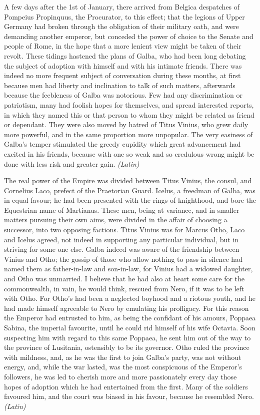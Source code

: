 
A few days after the 1st of January, there arrived from Belgica despatches of Pompeius Propinquus, the Procurator, to this effect; that the legions of Upper Germany had broken through the obligation of their military oath, and were demanding another emperor, but conceded the power of choice to the Senate and people of Rome, in the hope that a more lenient view might be taken of their revolt. These tidings hastened the plans of Galba, who had been long debating the subject of adoption with himself and with his intimate friends. There was indeed no more frequent subject of conversation during these months, at first because men had liberty and inclination to talk of such matters, afterwards because the feebleness of Galba was notorious. Few had any discrimination or patriotism, many had foolish hopes for themselves, and spread interested reports, in which they named this or that person to whom they might be related as friend or dependant. They were also moved by hatred of Titus Vinius, who grew daily more powerful, and in the same proportion more unpopular. The very easiness of Galba's temper stimulated the greedy cupidity which great advancement had excited in his friends, because with one so weak and so credulous wrong might be done with less risk and greater gain. \emph{(Latin)}


The real power of the Empire was divided between Titus Vinius, the consul, and Cornelius Laco, prefect of the Praetorian Guard. Icelus, a freedman of Galba, was in equal favour; he had been presented with the rings of knighthood, and bore the Equestrian name of Martianus. These men, being at variance, and in smaller matters pursuing their own aims, were divided in the affair of choosing a successor, into two opposing factions. Titus Vinius was for Marcus Otho, Laco and Icelus agreed, not indeed in supporting any particular individual, but in striving for some one else. Galba indeed was aware of the friendship between Vinius and Otho; the gossip of those who allow nothing to pass in silence had named them as father-in-law and son-in-law, for Vinius had a widowed daughter, and Otho was unmarried. I believe that he had also at heart some care for the commonwealth, in vain, he would think, rescued from Nero, if it was to be left with Otho. For Otho's had been a neglected boyhood and a riotous youth, and he had made himself agreeable to Nero by emulating his profligacy. For this reason the Emperor had entrusted to him, as being the confidant of his amours, Poppaea Sabina, the imperial favourite, until he could rid himself of his wife Octavia. Soon suspecting him with regard to this same Poppaea, he sent him out of the way to the province of Lusitania, ostensibly to be its governor. Otho ruled the province with mildness, and, as he was the first to join Galba's party, was not without energy, and, while the war lasted, was the most conspicuous of the Emperor's followers, he was led to cherish more and more passionately every day those hopes of adoption which he had entertained from the first. Many of the soldiers favoured him, and the court was biased in his favour, because he resembled Nero. \emph{(Latin)}

